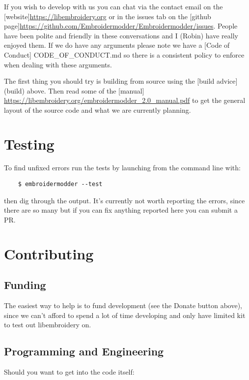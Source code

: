 \documentclass{report}
\begin{document}
If you wish to develop with us you can chat via the contact email
on the [website]\url{https://libembroidery.org} or in the issues tab on the
[github page]\url{https://github.com/Embroidermodder/Embroidermodder/issues}.
People have been polite and friendly in these conversations and I (Robin)
have really enjoyed them.
If we do have any arguments please note we have a
[Code of Conduct] CODE\_OF\_CONDUCT.md so there is a consistent policy to
enforce when dealing with these arguments.

The first thing you should try is building from source using the [build advice](build)
above. Then read some of the [manual] \url{https://libembroidery.org/embroidermodder_2.0_manual.pdf} to get the general
layout of the source code and what we are currently planning.

\section{Testing}

To find unfixed errors run the tests by launching from the command line with:

\begin{lstlisting}
    $ embroidermodder --test
\end{lstlisting}

then dig through the output. It's currently not worth reporting the errors, since
there are so many but if you can fix anything reported here you can submit a PR.

\section{Contributing}

\subsection{Funding}

The easiest way to help is to fund development (see the Donate button above),
since we can't afford to spend a lot of time developing and only have limited
kit to test out libembroidery on.

\subsection{Programming and Engineering}

Should you want to get into the code itself:
\end{document}
